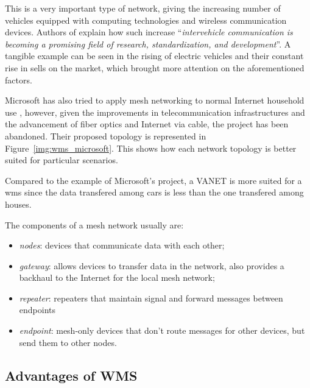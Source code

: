 		This is a very important type of network, giving the increasing number of vehicles equipped with computing technologies and wireless communication devices.
		Authors of \cite{BADIS2015653} explain how such increase ``\textit{intervehicle communication is becoming a promising field of research, standardization, and development}''.
		A tangible example can be seen in the rising of electric vehicles and their constant rise in sells on the market, which brought more attention on the aforementioned factors.
		
		Microsoft has also tried to apply mesh networking to normal Internet household use \cite{bahl2009opportunistic}, however, given the improvements in telecommunication infrastructures and the advancement of fiber optics and Internet via cable, the project has been abandoned.
		Their proposed topology is represented in Figure~\ref{img:wms_microsoft}.
		This shows how each network topology is better suited for particular scenarios.
		
		Compared to the example of Microsoft's project, a VANET is more suited for a wms since the data transfered among cars is less than the one transfered among houses.
				
		
		The components of a mesh network usually are:
		\begin{itemize}
			\item \textit{nodes}: devices that communicate data with each other;
			\item \textit{gateway}: allows devices to transfer data in the network, also provides a backhaul to the Internet for the local mesh network;
			\item \textit{repeater}: repeaters that maintain signal and forward messages between endpoints
			\item \textit{endpoint}: mesh-only devices that don't route messages for other devices, but send them to other nodes.
		\end{itemize}
		\vspace*{-\baselineskip}
		
		\subsection{Advantages of WMS}
		
